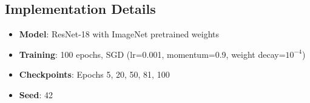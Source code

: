 \subsection{Implementation Details}

\begin{itemize}
    \item \textbf{Model}: ResNet-18 with ImageNet pretrained weights
    \item \textbf{Training}: 100 epochs, SGD (lr=0.001, momentum=0.9, weight decay=$10^{-4}$)
    \item \textbf{Checkpoints}: Epochs 5, 20, 50, 81, 100
    \item \textbf{Seed}: 42
\end{itemize}
